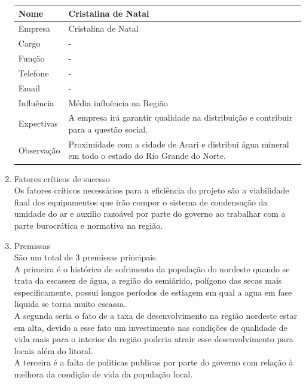 \begin{enumerate}
\begin{table}[!h]
\begin{tabular}{|p{5cm}|p{10cm}|}
\end{tabular}
\end{table}
\FloatBarrier

\begin{table}[!h]
\centering
\begin{tabular}{|p{5cm}|p{10cm}|}\hline
Nome & Cristalina de Natal\\ \hline                               
Empresa & Cristalina de Natal \\ \hline 
Cargo & - \\ \hline 
Função & - \\ \hline 
Telefone & - \\ \hline 
Email & - \\ \hline 
Influência & Média influência na Região \\ \hline 
Expectivas & A empresa irá garantir qualidade na distribuição e contribuir para a questão social.\\ \hline 
Observação & Proximidade com a cidade de Acari e distribui água mineral em todo o estado do Rio Grande do Norte. \\ \hline 
\end{tabular}
\end{table}
\FloatBarrier

\item Fatores críticos de sucesso\\
Os fatores críticos necessários para a eficiência do projeto são a viabilidade final dos equipamentos que irão compor o sistema de condensação da umidade do ar e auxilio razoável por parte do governo ao trabalhar com a parte burocrática e normativa na região.

\item Premissas\\
São um total de 3 premissas principais.\\
	A primeira é o histórico de sofrimento da população do nordeste quando se trata da escassez de água, a região do semiárido, polígono das secas mais especificamente, possui longos períodos de estiagem em qual a agua em fase liquida se torna muito escassa.\\
	A segunda seria o fato de a taxa de desenvolvimento na região nordeste estar em alta, devido a esse fato um investimento nas condições de qualidade de vida mais para o interior da região poderia atrair esse desenvolvimento para locais além do litoral.\\
	A terceira é a falta de politicas publicas por parte do governo com relação à melhora da condição de vida da população local. \\


\end{enumerate}
